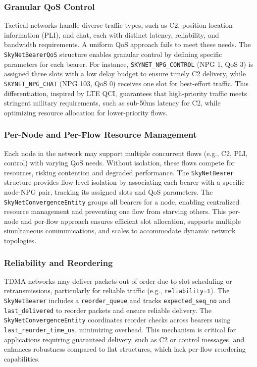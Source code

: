 \documentclass{article}
\begin{document}
\subsubsection{Granular QoS Control}
Tactical networks handle diverse traffic types, such as C2, position location
information (PLI), and chat, each with distinct latency, reliability,
and bandwidth requirements. A uniform QoS approach fails to meet these needs.
The \texttt{SkyNetBearerQoS} structure enables granular control by defining
specific parameters for each bearer. For instance, \texttt{SKYNET\_NPG\_CONTROL}
(NPG 1, QoS 3) is assigned three slots with a low delay budget to ensure timely
C2 delivery, while \texttt{SKYNET\_NPG\_CHAT} (NPG 103, QoS 0) receives one slot
for best-effort traffic. This differentiation, inspired by LTE QCI, guarantees
that high-priority traffic meets stringent military requirements,
such as sub-50ms latency for C2, while optimizing resource allocation for lower-priority flows.

\subsubsection{Per-Node and Per-Flow Resource Management}
Each node in the network may support multiple concurrent flows (e.g., C2, PLI, control)
with varying QoS needs. Without isolation, these flows compete for resources,
risking contention and degraded performance. The \texttt{SkyNetBearer}
structure provides flow-level isolation by associating each bearer with
a specific node-NPG pair, tracking its assigned slots and QoS parameters.
The \texttt{SkyNetConvergenceEntity} groups all bearers for a node,
enabling centralized resource management and preventing one flow from starving others.
This per-node and per-flow approach ensures efficient slot allocation,
supports multiple simultaneous communications, and scales to accommodate dynamic network topologies.

\subsubsection{Reliability and Reordering}
TDMA networks may deliver packets out of order due to slot scheduling
or retransmissions, particularly for reliable traffic (e.g., \texttt{reliability=1}).
The \texttt{SkyNetBearer} includes a \texttt{reorder\_queue} and
tracks \texttt{expected\_seq\_no} and \texttt{last\_delivered} to
reorder packets and ensure reliable delivery. The \texttt{SkyNetConvergenceEntity}
coordinates reorder checks across bearers using \texttt{last\_reorder\_time\_us},
minimizing overhead. This mechanism is critical for applications requiring guaranteed
delivery, such as C2 or control messages, and enhances robustness compared to
flat structures, which lack per-flow reordering capabilities.
\end{document}

